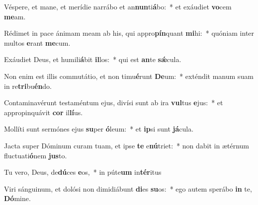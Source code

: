 \item Véspere, et mane, et merídie narrábo et an\textbf{nun}ti\textbf{á}bo:~* et exáudiet \textbf{vo}cem \textbf{me}am.
\item Rédimet in pace ánimam meam ab his, qui appro\textbf{pín}quant \textbf{mi}hi:~* quóniam inter multos \textbf{e}rant \textbf{me}cum.
\item Exáudiet Deus, et humili\textbf{á}bit \textbf{il}los:~* qui est \textbf{an}te \textbf{sǽ}cula.
\item Non enim est illis commutátio, et non timu\textbf{é}runt \textbf{De}um:~* exténdit manum suam in re\textbf{tri}bu\textbf{én}do.
\item Contaminavérunt testaméntum ejus, divísi sunt ab ira \textbf{vul}tus \textbf{e}jus:~* et appropinquávit \textbf{cor} il\textbf{lí}us.
\item Mollíti sunt sermónes ejus \textbf{su}per \textbf{ó}leum:~* et \textbf{ip}si sunt \textbf{já}cula.
\item Jacta super Dóminum curam tuam, et ipse \textbf{te} e\textbf{nú}triet:~* non dabit in ætérnum fluctuati\textbf{ó}nem \textbf{jus}to.
\item Tu vero, Deus, de\textbf{dú}ces \textbf{e}os,~* in púte\textbf{um} in\textbf{tér}itus
\item Viri sánguinum, et dolósi non dimidiábunt \textbf{di}es \textbf{su}os:~* ego autem sperábo \textbf{in} te, \textbf{Dó}mine.
